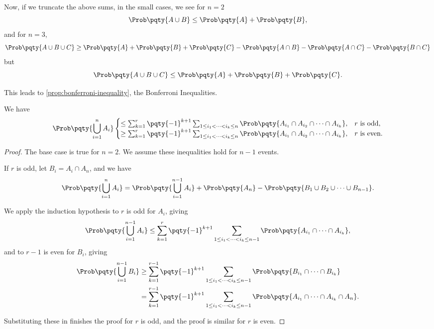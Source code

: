 Now, if we truncate the above sums, in the small cases, we see for \(n = 2\)
\[
    \Prob\pqty{A \cup B} \leq \Prob\pqty{A} + \Prob\pqty{B},
\]
and for \(n = 3\),
\[
    \Prob\pqty{A \cup B \cup C} \geq \Prob\pqty{A} + \Prob\pqty{B} + \Prob\pqty{C} - \Prob\pqty{A \cap B} - \Prob\pqty{A \cap C} - \Prob\pqty{B \cap C}
\]
but
\[
    \Prob\pqty{A \cup B \cup C} \leq \Prob\pqty{A} + \Prob\pqty{B} + \Prob\pqty{C}.
\]

This leads to \autoref{prop:bonferroni-inequality}, the Bonferroni Inequalities.

\begin{proposition}
    \label{prop:bonferroni-inequality}%
    We have
    \[
        \Prob\pqty{\bigcup_{i = 1}^{n} A_i} \begin{cases}
            \leq \sum_{k = 1}^{r} \pqty{-1}^{k + 1} \sum_{1 \leq i_1 < \cdots < i_k \leq n} \Prob\pqty{A_{i_1} \cap A_{i_2} \cap \cdots \cap A_{i_k}}, & r \text{ is odd}, \\
            \geq \sum_{k = 1}^{r} \pqty{-1}^{k + 1} \sum_{1 \leq i_1 < \cdots < i_k \leq n} \Prob\pqty{A_{i_1} \cap A_{i_2} \cap \cdots \cap A_{i_k}}, & r \text{ is even}.
        \end{cases}
    \]
\end{proposition}

\begin{proof}
    The base case is true for \(n = 2\). We assume these inequalities hold for \(n - 1\) events.

    If \(r\) is odd, let \(B_i = A_i \cap A_n\), and we have
    \[
        \Prob\pqty{\bigcup_{i = 1}^{n} A_i} = \Prob\pqty{\bigcup_{i = 1}^{n - 1} A_i} + \Prob\pqty{A_n} - \Prob\pqty{B_1 \cup B_2 \cup \cdots \cup B_{n - 1}}.
    \]

    We apply the induction hypothesis to \(r\) is odd for \(A_i\), giving
    \[
        \Prob\pqty{\bigcup_{i = 1}^{n - 1} A_i} \leq \sum_{k = 1}^{r} \pqty{-1}^{k + 1} \sum_{1 \leq i_1 < \cdots < i_k \leq n - 1} \Prob\pqty{A_{i_1} \cap \cdots \cap A_{i_k}},
    \]
    and to \(r - 1\) is even for \(B_i\), giving
    \begin{align*}
        \Prob\pqty{\bigcup_{i = 1}^{n - 1} B_i} &\geq \sum_{k = 1}^{r - 1} \pqty{-1}^{k + 1} \sum_{1 \leq i_1 < \cdots < i_k \leq n - 1} \Prob\pqty{B_{i_1} \cap \cdots \cap B_{i_k}} \\
        &= \sum_{k = 1}^{r - 1} \pqty{-1}^{k + 1} \sum_{1 \leq i_1 < \cdots < i_k \leq n - 1} \Prob\pqty{A_{i_1} \cap \cdots \cap A_{i_k} \cap A_n}.
    \end{align*}

    Substituting these in finishes the proof for \(r\) is odd, and the proof is similar for \(r\) is even.
\end{proof}

